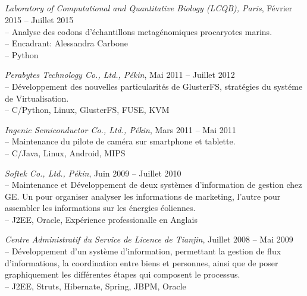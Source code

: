 \documentclass[10pt]{res} %
\begin{document}
\begin{resume}


\section{} 

\vspace{6pt} %

{\sl Laboratory of Computational and Quantitative Biology (LCQB), Paris},  \hfill Février 2015 -- Juillet 2015 \\ 
-- Analyse des codons d’échantillons metagénomiques procaryotes marins.\\
-- Encadrant: Alessandra Carbone\\
-- Python

\vspace{2pt}

{\sl Perabytes Technology Co., Ltd., Pékin},  \hfill Mai 2011 -- Juillet 2012 \\ 
-- Développement des nouvelles particularités de GlusterFS, stratégies du systéme de Virtualisation.\\
-- C/Python, Linux, GlusterFS, FUSE, KVM 

\vspace{2pt}

{\sl Ingenic Semiconductor Co., Ltd., Pékin}, \hfill Mars 2011 -- Mai 2011 \\
-- Maintenance du pilote de caméra sur smartphone et tablette. \\ 
-- C/Java, Linux, Android, MIPS 

\vspace{2pt}

{\sl Softek Co., Ltd., Pékin}, \hfill Juin 2009 -- Juillet 2010 \\
-- Maintenance et Développement de deux systèmes d’information de gestion chez GE. Un pour organiser analyser les informations de marketing, 
l’autre pour assembler les informations sur les énergies éoliennes.\\
-- J2EE, Oracle, Expérience professionalle en Anglais

\vspace{2pt}

{\sl Centre Administratif du Service de Licence de Tianjin}, \hfill Juillet 2008 -- Mai 2009 \\
-- Développement d’un système d’information, permettant la gestion de flux d’informations, la coordination entre biens et personnes, 
ainsi que de poser graphiquement les différentes étapes qui composent le processus.\\
-- J2EE, Struts, Hibernate, Spring, JBPM, Oracle


\end{resume}
\end{document}
